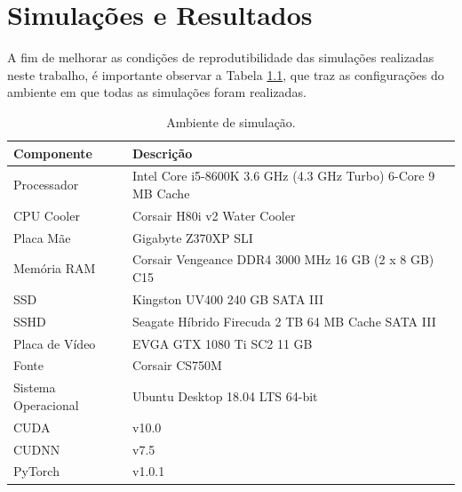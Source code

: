 \chapter{Simulações e Resultados}
\label{cha:results}

A fim de melhorar as condições de reprodutibilidade das simulações realizadas neste trabalho, é importante observar a Tabela \ref{tab:results_pc_specs}, que traz as configurações do ambiente em que todas as simulações foram realizadas.

\begin{table}[H]
    \centering
    \caption{Ambiente de simulação.}
    \begin{tabular}{ll}
        \toprule
        \textbf{Componente} &   \textbf{Descrição}\\
        \midrule
        Processador         &   Intel Core i5-8600K 3.6 GHz (4.3 GHz Turbo) 6-Core 9 MB Cache\\
        \hline
        CPU Cooler          &   Corsair H80i v2 Water Cooler\\
        \hline
        Placa Mãe           &   Gigabyte Z370XP SLI\\
        \hline
        Memória RAM         &   Corsair Vengeance DDR4 3000 MHz 16 GB (2 
        x 8 GB) C15\\
        \hline
        SSD                 &   Kingston UV400 240 GB SATA III\\
        \hline
        SSHD                &   Seagate Híbrido Firecuda 2 TB 64 MB Cache 
        SATA III\\
        \hline
        Placa de Vídeo      &   EVGA GTX 1080 Ti SC2 11 GB\\
        \hline
        Fonte               &   Corsair CS750M\\
        \hline
        Sistema Operacional &   Ubuntu Desktop 18.04 LTS 64-bit\\
        \hline
        CUDA                &   v10.0\\
        \hline
        CUDNN               &   v7.5\\
        \hline
        PyTorch             &   v1.0.1\\
        \bottomrule
    \end{tabular}
    \label{tab:results_pc_specs}
\end{table}

